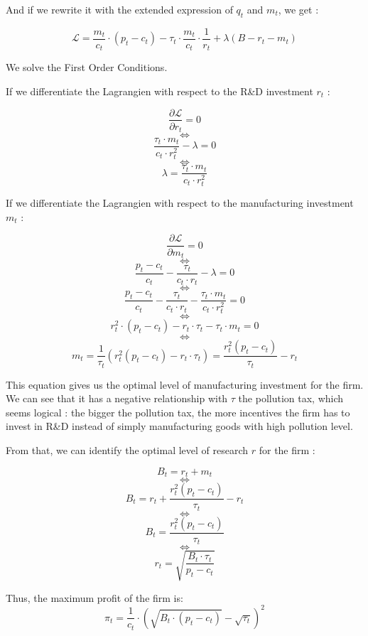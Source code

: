 \documentclass{article}
\begin{document}
And if we rewrite it with the extended expression of $q_{t}$ and $m_{t}$, we get : 

\begin{equation*}
    \mathcal{L} = \frac{m_{t}}{c_{t}}\cdot\left(p_{t}-c_{t}\right)-\tau_{t}\cdot \frac{m_{t}}{c_{t}}\cdot \frac{1}{r_{t}}+\lambda\left(B-r_{t}-m_{t}\right)
\end{equation*}

We solve the First Order Conditions.

If we differentiate the Lagrangien with respect to the R\&D investment $r_{t}$ :

$$\frac{\partial \mathcal{L}}{\partial r_{t}}=0$$
$$\iff$$
$$\frac{\tau_{t}\cdot m_{t}}{c_{t}\cdot r^{2}_{t}}-\lambda=0$$
$$\iff$$
$$\lambda=\frac{\tau_{t}\cdot m_{t}}{c_{t}\cdot r^{2}_{t}}$$

If we differentiate the Lagrangien with respect to the manufacturing investment $m_{t}$ :

$$\frac{\partial \mathcal{L}}{\partial m_{t}}=0$$
$$\iff$$
$$\frac{p_{t}-c_{t}}{c_{t}}-\frac{\tau_{t}}{c_{t}\cdot r_{t}}-\lambda=0$$
$$\iff$$
$$\frac{p_{t}-c_{t}}{c_{t}}-\frac{\tau_{t}}{c_{t}\cdot r_{t}}-\frac{\tau_{t}\cdot m_{t}}{c_{t}\cdot r^{2}_{t}}=0$$
$$\iff$$
$$r^{2}_{t}\cdot(p_{t}-c_{t})-r_{t}\cdot \tau_{t}-\tau_{t}\cdot m_{t}=0$$
$$\iff$$
\begin{equation}
    m_{t}=\frac{1}{\tau_{t}}\left(r_{t}^{2}(p_{t}-c_{t})-r_{t}\cdot \tau_{t}\right)=\frac{r_{t}^{2}\left(p_{t}-c_{t}\right)}{\tau_{t}}-r_{t}
\end{equation}

This equation gives us the optimal level of manufacturing investment for the firm. We can see that it has a negative relationship with $\tau$ the pollution tax, which seems logical : the bigger the pollution tax, the more incentives the firm has to invest in R\&D instead of simply manufacturing goods with high pollution level. 

From that, we can identify the optimal level of research $r$ for the firm :

$$B_{t}=r_{t}+m_{t}$$
$$\iff$$
$$B_{t}=r_{t}+\frac{r_{t}^{2}\left(p_{t}-c_{t}\right)}{\tau_{t}}-r_{t}$$
$$\iff$$
$$B_{t}=\frac{r_{t}^{2}\left(p_{t}-c_{t}\right)}{\tau_{t}}$$
$$\iff$$
\begin{equation}
    r_{t}=\sqrt{\frac{B_{t}\cdot \tau_{t}}{p_{t}-c_{t}}}
\end{equation}


Thus, the maximum profit of the firm is\footnotemark[1] : 
\begin{equation}
    \pi_{t}=\frac{1}{c_{t}}\cdot\left({\sqrt{B_{t}\cdot (p_{t}-c_{t})}-\sqrt{\tau_{t}}}\right)^{2}
\end{equation}
\end{document}
